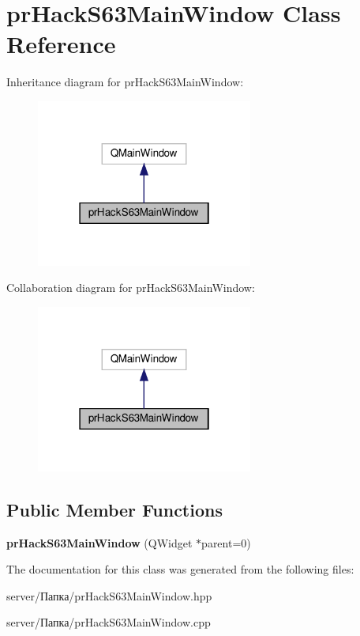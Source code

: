 \hypertarget{classpr_hack_s63_main_window}{}\section{pr\+Hack\+S63\+Main\+Window Class Reference}
\label{classpr_hack_s63_main_window}


Inheritance diagram for pr\+Hack\+S63\+Main\+Window\+:\nopagebreak
\begin{figure}[H]
\begin{center}
\leavevmode
\includegraphics[width=202pt]{classpr_hack_s63_main_window__inherit__graph}
\end{center}
\end{figure}


Collaboration diagram for pr\+Hack\+S63\+Main\+Window\+:\nopagebreak
\begin{figure}[H]
\begin{center}
\leavevmode
\includegraphics[width=202pt]{classpr_hack_s63_main_window__coll__graph}
\end{center}
\end{figure}
\subsection*{Public Member Functions}
\begin{DoxyCompactItemize}
\item 
\mbox{\label{classpr_hack_s63_main_window_a89c769594f2479e0f655ba144674203d}} 
{\bfseries pr\+Hack\+S63\+Main\+Window} (Q\+Widget $\ast$parent=0)
\end{DoxyCompactItemize}


The documentation for this class was generated from the following files\+:\begin{DoxyCompactItemize}
\item 
server/Папка/pr\+Hack\+S63\+Main\+Window.\+hpp\item 
server/Папка/pr\+Hack\+S63\+Main\+Window.\+cpp\end{DoxyCompactItemize}
